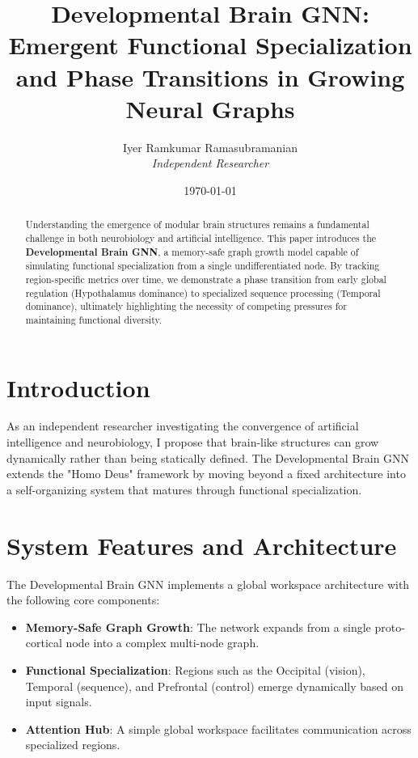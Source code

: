 \documentclass[12pt]{article}
\title{\textbf{Developmental Brain GNN: \\ Emergent Functional Specialization and Phase Transitions in Growing Neural Graphs}}
\author{Iyer Ramkumar Ramasubramanian \\ \textit{Independent Researcher}}
\date{\today}
\begin{document}
\maketitle

\begin{abstract}
Understanding the emergence of modular brain structures remains a fundamental challenge in both neurobiology and artificial intelligence. This paper introduces the \textbf{Developmental Brain GNN}, a memory-safe graph growth model capable of simulating functional specialization from a single undifferentiated node. By tracking region-specific metrics over time, we demonstrate a phase transition from early global regulation (Hypothalamus dominance) to specialized sequence processing (Temporal dominance), ultimately highlighting the necessity of competing pressures for maintaining functional diversity.
\end{abstract}

\section{Introduction}
As an independent researcher investigating the convergence of artificial intelligence and neurobiology, I propose that brain-like structures can grow dynamically rather than being statically defined. The Developmental Brain GNN extends the "Homo Deus" framework by moving beyond a fixed architecture into a self-organizing system that matures through functional specialization.

\section{System Features and Architecture}

The Developmental Brain GNN implements a global workspace architecture with the following core components:

\begin{itemize}
\item \textbf{Memory-Safe Graph Growth}: The network expands from a single proto-cortical node into a complex multi-node graph.
\item \textbf{Functional Specialization}: Regions such as the Occipital (vision), Temporal (sequence), and Prefrontal (control) emerge dynamically based on input signals.
\item \textbf{Attention Hub}: A simple global workspace facilitates communication across specialized regions.
\end{itemize}
\end{document}
